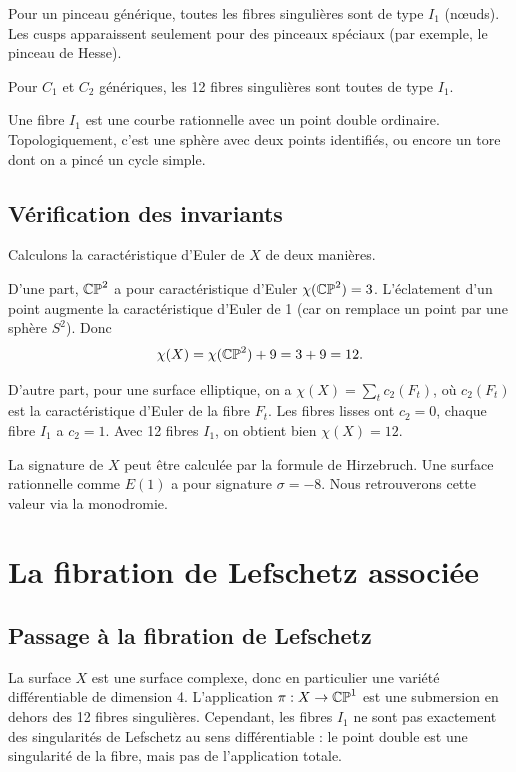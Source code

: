 Pour un pinceau générique, toutes les fibres singulières sont de type $I_1$ (nœuds). Les cusps apparaissent seulement pour des pinceaux spéciaux (par exemple, le pinceau de Hesse).

\begin{proposition}
Pour $C_1$ et $C_2$ génériques, les 12 fibres singulières sont toutes de type $I_1$.
\end{proposition}

Une fibre $I_1$ est une courbe rationnelle avec un point double ordinaire. Topologiquement, c'est une sphère avec deux points identifiés, ou encore un tore dont on a pincé un cycle simple.

\subsection{Vérification des invariants}

Calculons la caractéristique d'Euler de $X$ de deux manières.

D'une part, $\mathbb{CP}^2$ a pour caractéristique d'Euler $\chi(\mathbb{CP}^2) = 3$. L'éclatement d'un point augmente la caractéristique d'Euler de 1 (car on remplace un point par une sphère $S^2$). Donc
\[
\chi(X) = \chi(\mathbb{CP}^2) + 9 = 3 + 9 = 12.
\]

D'autre part, pour une surface elliptique, on a $\chi(X) = \sum_{t} c_2(F_t)$, où $c_2(F_t)$ est la caractéristique d'Euler de la fibre $F_t$. Les fibres lisses ont $c_2 = 0$, chaque fibre $I_1$ a $c_2 = 1$. Avec 12 fibres $I_1$, on obtient bien $\chi(X) = 12$.

La signature de $X$ peut être calculée par la formule de Hirzebruch. Une surface rationnelle comme $E(1)$ a pour signature $\sigma = -8$. Nous retrouverons cette valeur via la monodromie.

\section{La fibration de Lefschetz associée}

\subsection{Passage à la fibration de Lefschetz}

La surface $X$ est une surface complexe, donc en particulier une variété différentiable de dimension 4. L'application $\pi: X \to \mathbb{CP}^1$ est une submersion en dehors des 12 fibres singulières. Cependant, les fibres $I_1$ ne sont pas exactement des singularités de Lefschetz au sens différentiable : le point double est une singularité de la fibre, mais pas de l'application totale.

